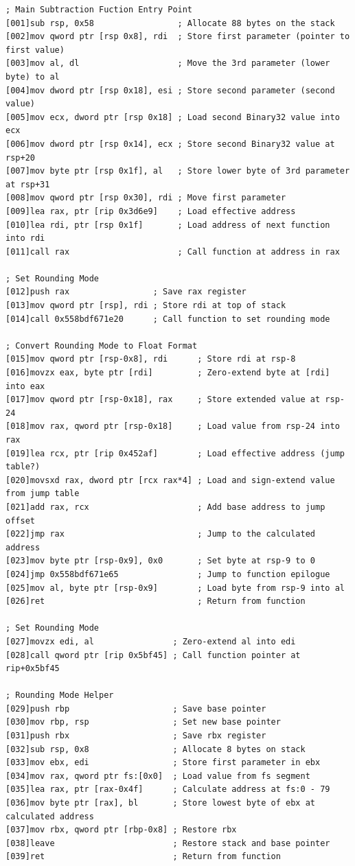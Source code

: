 \documentclass[12pt,letter]{article}
\begin{document}
\begin{lstlisting}[style=rust, caption={Annotated Binary32 Normal Case Subtraction Instruction Trace}, label={fig:ieee_subtract}]
; Main Subtraction Fuction Entry Point
[001]sub rsp, 0x58                 ; Allocate 88 bytes on the stack
[002]mov qword ptr [rsp 0x8], rdi  ; Store first parameter (pointer to first value)
[003]mov al, dl                    ; Move the 3rd parameter (lower byte) to al
[004]mov dword ptr [rsp 0x18], esi ; Store second parameter (second value)
[005]mov ecx, dword ptr [rsp 0x18] ; Load second Binary32 value into ecx
[006]mov dword ptr [rsp 0x14], ecx ; Store second Binary32 value at rsp+20
[007]mov byte ptr [rsp 0x1f], al   ; Store lower byte of 3rd parameter at rsp+31
[008]mov qword ptr [rsp 0x30], rdi ; Move first parameter
[009]lea rax, ptr [rip 0x3d6e9]    ; Load effective address
[010]lea rdi, ptr [rsp 0x1f]       ; Load address of next function into rdi
[011]call rax                      ; Call function at address in rax

; Set Rounding Mode
[012]push rax                 ; Save rax register
[013]mov qword ptr [rsp], rdi ; Store rdi at top of stack
[014]call 0x558bdf671e20      ; Call function to set rounding mode

; Convert Rounding Mode to Float Format
[015]mov qword ptr [rsp-0x8], rdi      ; Store rdi at rsp-8
[016]movzx eax, byte ptr [rdi]         ; Zero-extend byte at [rdi] into eax
[017]mov qword ptr [rsp-0x18], rax     ; Store extended value at rsp-24
[018]mov rax, qword ptr [rsp-0x18]     ; Load value from rsp-24 into rax
[019]lea rcx, ptr [rip 0x452af]        ; Load effective address (jump table?)
[020]movsxd rax, dword ptr [rcx rax*4] ; Load and sign-extend value from jump table
[021]add rax, rcx                      ; Add base address to jump offset
[022]jmp rax                           ; Jump to the calculated address
[023]mov byte ptr [rsp-0x9], 0x0       ; Set byte at rsp-9 to 0
[024]jmp 0x558bdf671e65                ; Jump to function epilogue
[025]mov al, byte ptr [rsp-0x9]        ; Load byte from rsp-9 into al
[026]ret                               ; Return from function

; Set Rounding Mode
[027]movzx edi, al                ; Zero-extend al into edi
[028]call qword ptr [rip 0x5bf45] ; Call function pointer at rip+0x5bf45

; Rounding Mode Helper
[029]push rbp                     ; Save base pointer
[030]mov rbp, rsp                 ; Set new base pointer
[031]push rbx                     ; Save rbx register
[032]sub rsp, 0x8                 ; Allocate 8 bytes on stack
[033]mov ebx, edi                 ; Store first parameter in ebx
[034]mov rax, qword ptr fs:[0x0]  ; Load value from fs segment
[035]lea rax, ptr [rax-0x4f]      ; Calculate address at fs:0 - 79
[036]mov byte ptr [rax], bl       ; Store lowest byte of ebx at calculated address
[037]mov rbx, qword ptr [rbp-0x8] ; Restore rbx
[038]leave                        ; Restore stack and base pointer
[039]ret                          ; Return from function


\end{lstlisting}
\end{document}
